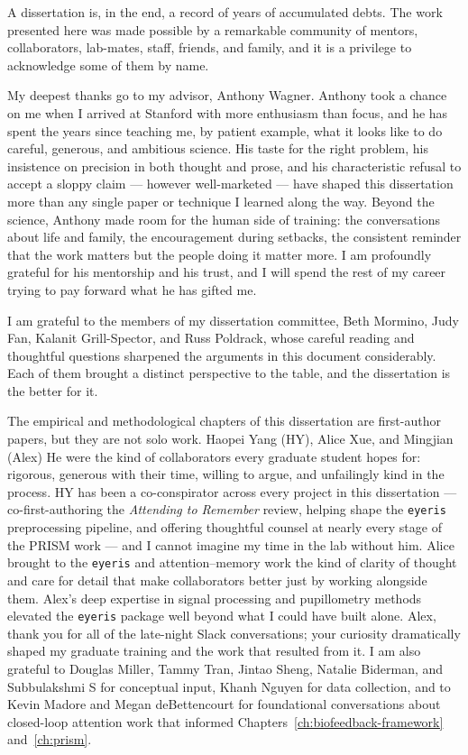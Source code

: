 
A dissertation is, in the end, a record of years of accumulated debts. The work presented here was made possible by a remarkable community of mentors, collaborators, lab-mates, staff, friends, and family, and it is a privilege to acknowledge some of them by name.

My deepest thanks go to my advisor, Anthony Wagner. Anthony took a chance on me when I arrived at Stanford with more enthusiasm than focus, and he has spent the years since teaching me, by patient example, what it looks like to do careful, generous, and ambitious science. His taste for the right problem, his insistence on precision in both thought and prose, and his characteristic refusal to accept a sloppy claim --- however well-marketed --- have shaped this dissertation more than any single paper or technique I learned along the way. Beyond the science, Anthony made room for the human side of training: the conversations about life and family, the encouragement during setbacks, the consistent reminder that the work matters but the people doing it matter more. I am profoundly grateful for his mentorship and his trust, and I will spend the rest of my career trying to pay forward what he has gifted me.

I am grateful to the members of my dissertation committee, Beth Mormino, Judy Fan, Kalanit Grill-Spector, and Russ Poldrack, whose careful reading and thoughtful questions sharpened the arguments in this document considerably. Each of them brought a distinct perspective to the table, and the dissertation is the better for it.

The empirical and methodological chapters of this dissertation are first-author papers, but they are not solo work. Haopei Yang (HY), Alice Xue, and Mingjian (Alex) He were the kind of collaborators every graduate student hopes for: rigorous, generous with their time, willing to argue, and unfailingly kind in the process. HY has been a co-conspirator across every project in this dissertation --- co-first-authoring the \textit{Attending to Remember} review, helping shape the \texttt{eyeris} preprocessing pipeline, and offering thoughtful counsel at nearly every stage of the PRISM work --- and I cannot imagine my time in the lab without him. Alice brought to the \texttt{eyeris} and attention--memory work the kind of clarity of thought and care for detail that make collaborators better just by working alongside them. Alex's deep expertise in signal processing and pupillometry methods elevated the \texttt{eyeris} package well beyond what I could have built alone. Alex, thank you for all of the late-night Slack conversations; your curiosity dramatically shaped my graduate training and the work that resulted from it. I am also grateful to Douglas Miller, Tammy Tran, Jintao Sheng, Natalie Biderman, and Subbulakshmi S for conceptual input, Khanh Nguyen for data collection, and to Kevin Madore and Megan deBettencourt for foundational conversations about closed-loop attention work that informed Chapters~\ref{ch:biofeedback-framework} and~\ref{ch:prism}.

